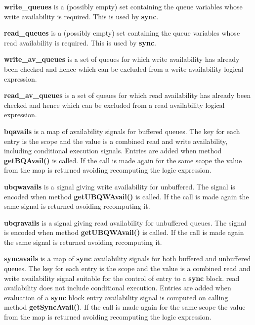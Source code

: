 \documentclass[10pt,a4paper,twoside,fleqn]{book}
\begin{document}
            {\bf write\_queues} is a (possibly empty) set
            containing the queue variables whose write availability is
            required. This is used by {\bf sync{}}.

            {\bf read\_queues} is a (possibly empty) set
            containing the queue variables whose read availability is
            required. This is used by {\bf sync{}}.

            {\bf write\_av\_queues} is a set of queues for which write
            availability has already been checked and hence which can be
            excluded from a write availability logical expression.

            {\bf read\_av\_queues} is a set of queues for which read
            availability has already been checked and hence which can be
            excluded from a read availability logical expression.

            {\bf bqavails} is a map of availability signals for buffered queues. The
            key for each entry is the scope and the value is a combined read and
            write availability, including conditional execution signals. Entries are
            added when method {\bf getBQAvail()} is called. If the call is made
            again for the same scope the value from the map is returned avoiding
            recomputing the logic expression.
            
            {\bf ubqwavails} is a signal giving write availability for unbuffered.
            The signal is encoded when method {\bf getUBQWAvail()} is called. If the
            call is made again the same signal is returned avoiding recomputing it.

            {\bf ubqravails} is a signal giving read availability for unbuffered
            queues. The signal is encoded when method {\bf getUBQWAvail()} is
            called. If the call is made again the same signal is returned avoiding
            recomputing it.

            {\bf syncavails} is a map of {\bf sync{}} availability signals for both
            buffered and unbuffered queues. The key for each entry is the scope and
            the value is a combined read and write availability signal suitable for
            the control of entry to a {\bf sync{}} block. read availability does not
            include conditional execution. Entries are added when evaluation of a
            {\bf sync{}} block entry availability signal is computed on calling
            method {\bf getSyncAvail()}. If the call is made again for the same
            scope the value from the map is returned avoiding recomputing the logic
            expression.
\end{document}
